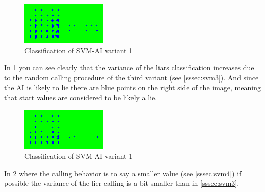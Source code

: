 \documentclass[11pt]{article}
\begin{document}
\begin{figure}[H]
	\centering
	\includegraphics[width=.45\textwidth]{../testdata/svm3.png}
	\caption{Classification of SVM-AI variant 1}
	\label{fig:svm3}
\end{figure}
In \cref{fig:svm3} you can see clearly that the variance of the liars classification increases due to the random calling procedure of the third variant (see \cref{sssec:svm3}). And since the AI is likely to lie there are blue points on the right side of the image, meaning that start values are considered to be likely a lie. 

\begin{figure}[H]
	\centering
	\includegraphics[width=.45\textwidth]{../testdata/svm4.png}
	\caption{Classification of SVM-AI variant 1}
	\label{fig:svm4}
\end{figure}

In \cref{fig:svm4} where the calling behavior is to say a smaller value (see \cref{sssec:svm4}) if possible the variance of the lier calling is a bit smaller than in \cref{sssec:svm3}.
\end{document}
